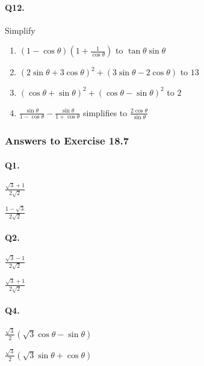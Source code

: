 \documentclass{article}
\begin{document}
\paragraph{Q12.}
Simplify

\begin{enumerate}[label=(\alph*)]
  \item $(1-\cos\theta)\left( 1+ \frac{1}{\cos\theta} \right)$ to $\tan\theta \sin\theta$
    \item $(2\sin\theta + 3\cos\theta)^{2} + (3\sin\theta - 2\cos\theta)$ to $13$
    \item $(\cos\theta + \sin\theta)^{2} + (\cos\theta - \sin\theta)^{2}$ to $2$
  \item $\frac{\sin\theta}{1-\cos\theta} - \frac{\sin\theta}{1+\cos\theta}$ simplifies to $\frac{2\cos\theta}{\sin\theta}$
\end{enumerate}

\subsubsection {Answers to Exercise 18.7}

\paragraph{Q1.}
\begin{enumerate*}[label=(\alph*)]
          \item $\frac{\sqrt{3}+1}{2 \sqrt{2}}$
          \item $\frac{1-\sqrt{3}}{2 \sqrt{2}}$
\end{enumerate*}

\paragraph{Q2.}
\begin{enumerate*}[label=(\alph*)]
          \item $\frac{\sqrt{3}-1}{2 \sqrt{2}}$
          \item $\frac{\sqrt{3}+1}{2 \sqrt{2}}$
\end{enumerate*}

\paragraph{Q4.}
\begin{enumerate*}[label=(\alph*)]
          \item $\frac{\sqrt{3}}{2}(\sqrt{3}\cos\theta-\sin\theta)$
          \item $\frac{\sqrt{3}}{2}(\sqrt{3}\sin\theta+\cos\theta)$
\end{enumerate*}
\end{document}
